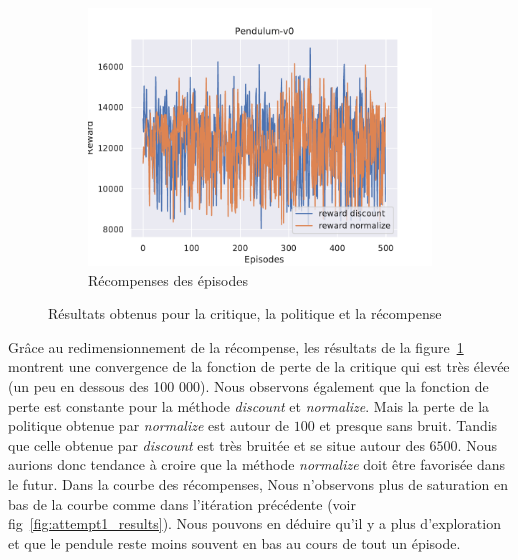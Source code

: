 \begin{figure}[H]
\begin{subfigure}{0.3\textwidth}
    \end{subfigure}
    \begin{subfigure}{0.3\textwidth}
        \includegraphics[width=\textwidth]{figures/iteration2/rewards_Pendulum-v0_pg_dataset_td_eval_True_cycles_500_trajs_20_batches_20_gamma_0.99_nstep_5_lr_act_0.01_lr_critic_0.01.pdf}
        \caption{Récompenses des épisodes}
    \end{subfigure}
    \caption{Résultats obtenus pour la critique, la politique et la récompense}
    \label{fig:itr2_results}
\end{figure}

Grâce au redimensionnement de la récompense, les résultats de la figure~\ref{fig:itr2_results} montrent une convergence de la fonction de perte de la critique qui est très élevée (un peu en dessous des 100 000). Nous observons également que la fonction de perte est constante pour la méthode \emph{discount} et \emph{normalize}. Mais la perte de la politique obtenue par \emph{normalize} est autour de $100$ et presque sans bruit. Tandis que celle obtenue par \emph{discount} est très bruitée et se situe autour des $6500$. Nous aurions donc tendance à croire que la méthode \emph{normalize} doit être favorisée dans le futur. Dans la courbe des récompenses, Nous n'observons plus de saturation en bas de la courbe comme dans l'itération précédente (voir fig~\ref{fig:attempt1_results}). Nous pouvons en déduire qu'il y a plus d'exploration et que le pendule reste moins souvent en bas au cours de tout un épisode.

